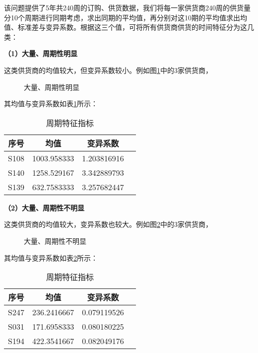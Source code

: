 \documentclass[withoutpreface,bwprint]{cumcmthesis} %
\begin{document}
该问题提供了5年共240周的订购、供货数据，我们将每一家供货商240周的供货量分10个周期进行同期考虑，求出同期的平均值，再分别对这10期的平均值求出均值、标准差与变异系数。根据这三个值，可将所有供货商供货的时间特征分为这几类：
\begin{spacing}{1.8}\textbf{（1）大量、周期性明显}\end{spacing}
这类供货商的均值较大，但变异系数较小。例如图\ref{大量、周期性明显}中的3家供货商，
\begin{figure}[H]
    \label{大量、周期性明显}
    \caption{大量、周期性明显}
\end{figure}
其均值与变异系数如表\ref{周期特征指标1}所示：
\begin{table}[h]
    \caption{周期特征指标}\label{周期特征指标1} \centering
    \centering
    \begin{tabular}{|c|c|c|c|}
    \hline
    序号 & 均值 & 变异系数 \\ \hline
    S108 & 1003.958333 & 1.203816916 \\ \hline
    S140 & 1258.529167 & 3.342889793 \\ \hline
    S139 & 632.7583333 & 3.257682447 \\ \hline
    \end{tabular}
\end{table}

\begin{spacing}{1.8}\textbf{（2）大量、周期性不明显}\end{spacing}
这类供货商的均值较大，变异系数也较大。例如图\ref{大量、周期性不明显}中的3家供货商，
\begin{figure}[H]
    \label{大量、周期性不明显}
    \caption{大量、周期性不明显}
\end{figure}
其均值与变异系数如表\ref{周期特征指标2}所示：
\begin{table}[h]
    \caption{周期特征指标}\label{周期特征指标2} \centering
    \centering
    \begin{tabular}{|c|c|c|c|}
    \hline
    序号 & 均值 & 变异系数 \\ \hline
    S247 & 236.2416667 & 0.079119526 \\ \hline
    S031 & 171.6958333 & 0.080180225 \\ \hline
    S194 & 422.3541667 & 0.082049176 \\ \hline
    \end{tabular}
\end{table}
\end{document}
